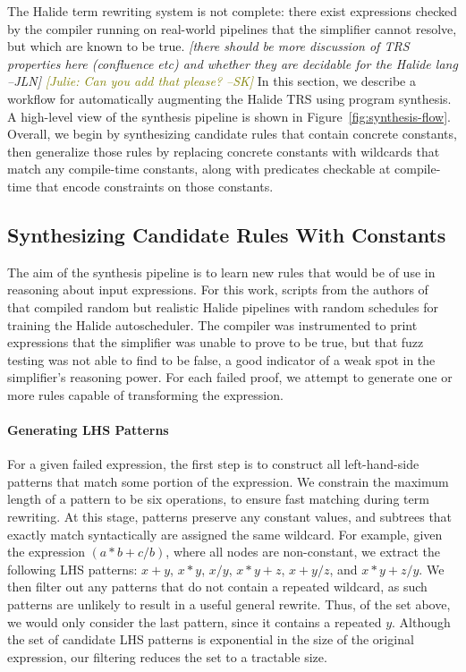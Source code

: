\documentclass[sigplan,10pt,review,anonymous]{acmart}\settopmatter{printfolios=true,printccs=false,printacmref=false}
\newcommand{\jln}[1]{\textcolor{uwpurple}{\textit{[{#1} --JLN]}}}
\newcommand{\sak}[1]{\textcolor{olive}{\textit{[{#1} --SK]}}}
\begin{document}
The Halide term rewriting system is not complete: there
exist expressions checked by the compiler running on real-world pipelines that
the simplifier cannot resolve, but which are known to be true. \jln{there should
  be more discussion of TRS properties here (confluence etc) and whether they
  are decidable for the Halide lang} \sak{Julie: Can you add that please?}
In this section, we describe a workflow for automatically augmenting the Halide
TRS using program synthesis.
A high-level view of the synthesis pipeline is shown in Figure~\ref{fig:synthesis-flow}.
Overall, we begin by synthesizing candidate rules that contain concrete constants,
then generalize those rules by replacing concrete constants with wildcards that
match any compile-time constants, along with predicates checkable at compile-time
that encode constraints on those constants.

\subsection{Synthesizing Candidate Rules With Constants}
The aim of the synthesis pipeline is to learn new rules that would be of use in reasoning about input expressions.
For this work, scripts from the authors of \citeauthor{Adams2019}~\cite{Adams2019} that compiled
 random but realistic Halide pipelines with random schedules for
training the Halide autoscheduler. The compiler was instrumented to print expressions that the simplifier was unable to prove to be true, but that fuzz testing was not able to find to be false, a good indicator of a weak spot in the simplifier's reasoning power.
 For each failed proof, we attempt to generate one or more rules capable of transforming the expression.


\paragraph{Generating LHS Patterns} For a given failed expression, the first step
is to construct all left-hand-side patterns that match some portion of the expression.
We constrain the maximum length of a pattern to be six operations, to ensure fast matching
during term rewriting. At this stage, patterns preserve any constant values, and subtrees
that exactly match syntactically are assigned the same wildcard. For
example, given the expression $(a*b + c/b)$, where all nodes are non-constant,
we extract the following LHS patterns: $x + y$, $x * y$, $x / y$, $x * y + z$,
$x + y/z$, and $x*y + z/y$.  We then filter out any patterns that do not contain
a repeated wildcard, as such patterns are unlikely to result in a useful general
rewrite.  Thus, of the set above, we would only consider the last pattern, since
it contains a repeated $y$.  Although the set of candidate LHS patterns is exponential
in the size of the original expression, our filtering reduces the set to a tractable
size.
\end{document}
